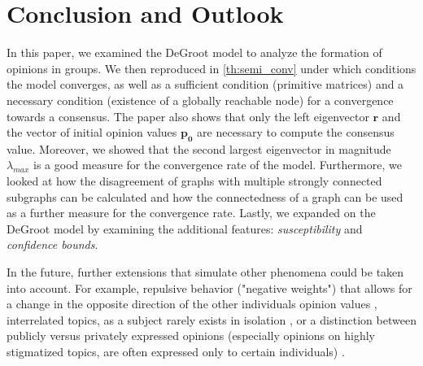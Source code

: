 \documentclass[journal,compsoc,10pt]{IEEEtran}
\renewcommand{\vec}[1]{\bm{#1}}        %
\newcommand{\mat}[1]{\bm{#1}}          %
\begin{document}




\section{Conclusion and Outlook}
In this paper, we examined the DeGroot model to analyze the formation of opinions in groups. 
We then reproduced in \cref{th:semi_conv} under which conditions the model converges, as well as a sufficient condition (primitive matrices) and a necessary condition (existence of a globally reachable node) for a convergence towards a consensus. The paper also shows that only the left eigenvector $\vec{r}$ and the vector of initial opinion values $\vec{p_0}$ are necessary to compute the consensus value. Moreover, we showed that the second largest eigenvector in magnitude $\lambda_{max}$ is a good measure for the convergence rate of the model. Furthermore, we looked at how the disagreement of graphs with multiple strongly connected subgraphs can be calculated and how the connectedness of a graph can be used as a further measure for the convergence rate. Lastly, we expanded on the DeGroot model by examining the additional features: \textit{susceptibility} and \textit{confidence bounds}.

In the future, further extensions that simulate other phenomena could be taken into account. For example, repulsive behavior ("negative weights") that allows for a change in the opposite direction of the other individuals opinion values \cite{chen2019opiniondynamicsbackfireeffect}, interrelated topics, as a subject rarely exists in isolation \cite{Parsegov_2017}, or a distinction between publicly versus privately expressed opinions (especially opinions on highly stigmatized topics, are often expressed only to certain individuals) \cite{Ye_2019}.




\end{document}
